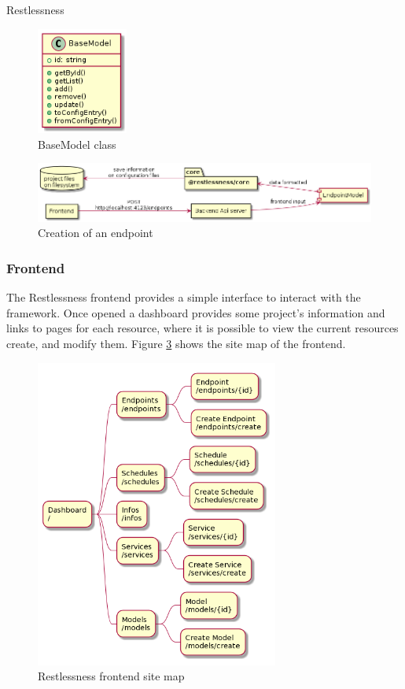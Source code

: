 \begin{chapter}{Restlessness}
    \begin{figure}
        \centering
        \includegraphics[width=3cm]{source/diagrams/rln_backend_base_model.png}
        \caption{BaseModel class}
        \label{fig:base_model_class}
    \end{figure}

    \begin{figure}
        \centering
        \includegraphics[width=\linewidth]{source/diagrams/rln_backend_endpoint_creation.png}
        \caption{Creation of an endpoint}
        \label{fig:backend_endpoint_flow}
    \end{figure}

    \subsubsection{Frontend}
    The Restlessness frontend provides a simple interface to interact with the
    framework. Once opened a dashboard provides some project's information and
    links to pages for each resource, where it is possible to view the current
    resources create, and modify them.
    Figure \ref{fig:frontend_site_map} shows the site map of the frontend.

    \begin{figure}
        \centering
        \includegraphics[width=8cm]{source/diagrams/frontend_site_map.png}
        \caption{Restlessness frontend site map}
        \label{fig:frontend_site_map}
    \end{figure}


\end{chapter}

